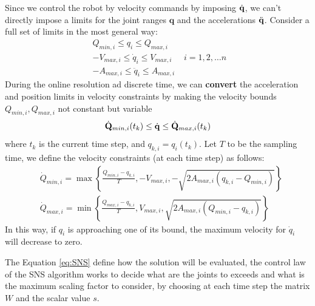 \documentclass[10pt, a4paper]{report}
\newcommand{\q}{{\mathbf q}}
\begin{document}
Since we control the robot by velocity commands by imposing ${\dot{\mathbf q}}$, we can't directly impose a limits for the joint ranges $\q$ and the accelerations ${\ddot{\mathbf q}}$. Consider a full set of limits in the most general way:
\begin{equation}
    \begin{matrix}
        Q_{min,i}\le q_i \le Q_{max,i} \\ 
        -V_{max,i}\le \dot q_i \le V_{max,i}\\ 
        -A_{max,i}\le \ddot q_i \le A_{max,i}
    \end{matrix} \ \ \ i=1,2,\dots n
\end{equation}
During the online resolution ad discrete time, we can \textbf{convert} the acceleration and position limits in velocity constraints by making the velocity bounds $Q_{min,i},Q_{max,i}$ not constant but variable\begin{equation}
    \dot{\mathbf Q}_{min,i}(t_k) \le {\dot{\mathbf q}} \le \dot{\mathbf Q}_{max,i}(t_k)
\end{equation} 
where $t_k$ is the current time step, and $q_{k,i}=q_i(t_k)$. Let $T$ to be the sampling time, we define the velocity constraints (at each time step) as follows:\begin{align*}
    &
    \dot Q_{min,i}=\max\left\{
        \frac{Q_{min,i}-q_{k,i}}{T},
        -V_{max,i}, 
        -\sqrt{2A_{max,i}(q_{k,i}-Q_{min,i})}
        \right\}
    \\ 
    &
    \dot Q_{max,i}=\min\left\{
        \frac{Q_{max,i}-q_{k,i}}{T},
        V_{max,i}, 
        \sqrt{2A_{max,i}(Q_{min,i}-q_{k,i})}
        \right\}
\end{align*} 
In this way, if $q_i$ is approaching one of its bound, the maximum velocity for $\dot q_i$ will decrease to zero.\bigskip

The Equation \eqref{eq:SNS} define how the solution will be evaluated, the control law of the SNS algorithm works to decide what are the joints to exceeds and what is the maximum scaling factor to consider, by choosing at each time step the matrix $W$ and the scalar value $s$.
\end{document}
